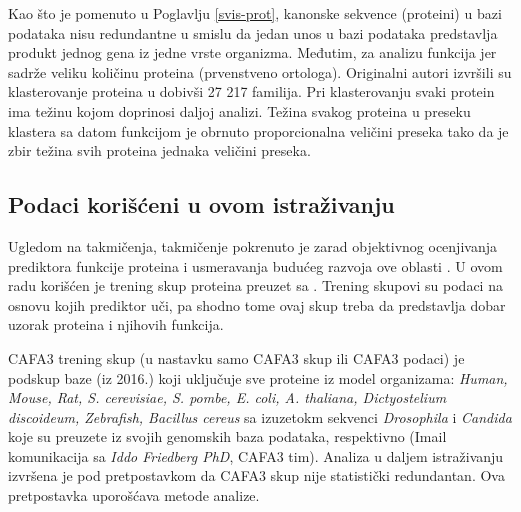 Kao što je pomenuto u Poglavlju \ref{svis-prot}, kanonske sekvence (proteini) u \swissprot
bazi podataka nisu redundantne u smislu da jedan unos u bazi podataka predstavlja produkt
jednog gena iz jedne vrste organizma. Međutim, za analizu funkcija
\swissprot {} \parencite{proveriti} jer
sadrže veliku količinu  proteina (prvenstveno ortologa).
Originalni autori izvršili su klasterovanje \swissprot
proteina u  dobivši 27 217 familija. Pri klasterovanju svaki protein
ima težinu kojom doprinosi daljoj analizi. Težina svakog proteina u preseku
klastera sa datom funkcijom je obrnuto proporcionalna veličini preseka
tako da je zbir težina svih proteina jednaka veličini preseka.

%

\subsection{Podaci korišćeni u ovom istraživanju}

Ugledom na  takmičenja,   takmičenje pokrenuto je zarad objektivnog ocenjivanja
prediktora funkcije proteina i usmeravanja budućeg razvoja ove oblasti
\parencite{CAFA}.  U ovom radu korišćen je trening skup proteina preuzet sa
. Trening skupovi su podaci na osnovu kojih prediktor uči, pa
shodno tome ovaj skup treba da predstavlja dobar uzorak proteina i njihovih
funkcija.

CAFA3 trening skup (u nastavku samo CAFA3 skup ili CAFA3 podaci) je podskup \swissprot baze (iz 2016.) koji
uključuje sve proteine iz model organizama: \textit{Human, Mouse, Rat, S.
cerevisiae, S. pombe, E. coli, A. thaliana, Dictyostelium discoideum,
Zebrafish, Bacillus cereus} sa izuzetokm sekvenci \textit{Drosophila} i \textit{Candida}
koje su preuzete iz svojih genomskih baza podataka, respektivno (Imail komunikacija sa \textit{Iddo Friedberg PhD}, CAFA3 tim).
Analiza u daljem istraživanju izvršena je pod pretpostavkom da CAFA3 skup nije statistički redundantan.
Ova pretpostavka uporošćava metode analize.

